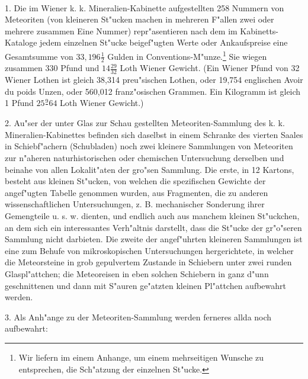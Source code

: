 \documentclass[a4paper, 11pt, oneside, polutonikogreek, german]{article}
\begin{document}
\paragraph{}
1. Die im Wiener k. k. Mineralien-Kabinette aufgestellten 258 Nummern von Meteoriten (von kleineren St"ucken machen in mehreren F"allen zwei oder mehrere zusammen Eine Nummer) repr"asentieren nach dem im Kabinetts-Kataloge jedem einzelnen St"ucke beigef"ugten Werte oder Ankaufspreise eine Gesamtsumme von $33,196\frac{1}{2}$ Gulden in Conventions-M"unze.\footnote{Wir liefern im einem Anhange, um einem mehrseitigen Wunsche zu entsprechen, die Sch"atzung der einzelnen St"ucke.} Sie wiegen zusammen 330 Pfund und $14\frac{29}{32}$ Loth Wiener Gewicht. (Ein Wiener Pfund von 32 Wiener Lothen ist gleich 38,314 preu"sischen Lothen, oder 19,754 englischen Avoir du poids Unzen, oder 560,012 franz"osischen Grammen. Ein Kilogramm ist gleich 1 Pfund $25\frac{9}{}64$ Loth Wiener Gewicht.)

2. Au"ser der unter Glas zur Schau gestellten Meteoriten-Sammlung des k. k. Mineralien-Kabinettes befinden sich daselbst in einem Schranke des vierten Saales in Schiebf"achern (Schubladen) noch zwei kleinere Sammlungen von Meteoriten zur n"aheren naturhistorischen oder chemischen Untersuchung derselben und beinahe von allen Lokalit"aten der gro"sen Sammlung. Die erste, in 12 Kartons, besteht aus kleinen St"ucken, von welchen die spezifischen Gewichte der angef"ugten Tabelle genommen wurden, aus Fragmenten, die zu anderen wissenschaftlichen Untersuchungen, z. B. mechanischer Sonderung ihrer Gemengteile u. s. w. dienten, und endlich auch aus manchem kleinen St"uckchen, an dem sich ein interessantes Verh"altnis darstellt, dass die St"ucke der gr"o"seren Sammlung nicht darbieten. Die zweite der angef"uhrten kleineren Sammlungen ist eine zum Behufe von mikroskopischen Untersuchungen hergerichtete, in welcher die Meteorsteine in grob gepulvertem Zustande in Schiebern unter zwei runden Glaspl"attchen; die Meteoreisen in eben solchen Schiebern in ganz d"unn geschnittenen und dann mit S"auren ge"atzten kleinen Pl"attchen aufbewahrt werden.

3. Als Anh"ange zu der Meteoriten-Sammlung werden ferneres allda noch aufbewahrt:
\end{document}
